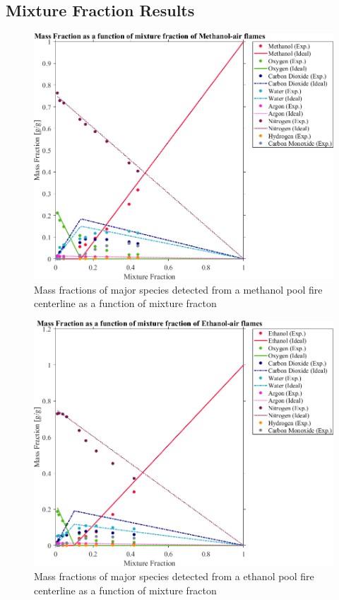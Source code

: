 \documentclass[12pt]{article}
\begin{document}
\subsection{Mixture Fraction Results}
\label{ssec:Mixture_Fraction_Results}

\begin{figure}[!]
	\centering
\includegraphics[width=12.0cm,keepaspectratio]{Methanol_Mass_Frac_Mix_Frac.png}
	\caption[Averaged quasi-steady mass fraction of major species as a function of mixture fraction for a methanol pool fire]{Mass fractions of major species detected from a methanol pool fire centerline as a function of mixture fracton}
	\label{fig:Methanol_Mix_Frac}
\end{figure}

\begin{figure}[!]
	\centering
\includegraphics[width=12.0cm,keepaspectratio]{Ethanol_Mass_Frac_Mix_Frac.png}
	\caption[Averaged quasi-steady mass fraction of major species as a function of mixture fraction for an ethanol pool fire]{Mass fractions of major species detected from a ethanol pool fire centerline as a function of mixture fracton}
	\label{fig:Ethanol_Mix_Frac}
\end{figure}
\end{document}
